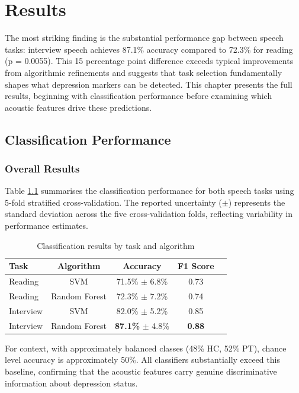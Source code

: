 \chapter{Results}

The most striking finding is the substantial performance gap between speech tasks: interview speech achieves 87.1\% accuracy compared to 72.3\% for reading (p = 0.0055). This 15 percentage point difference exceeds typical improvements from algorithmic refinements and suggests that task selection fundamentally shapes what depression markers can be detected. This chapter presents the full results, beginning with classification performance before examining which acoustic features drive these predictions.

\section{Classification Performance}

\subsection{Overall Results}

Table \ref{tab:classification-results} summarises the classification performance for both speech tasks using 5-fold stratified cross-validation. The reported uncertainty ($\pm$) represents the standard deviation across the five cross-validation folds, reflecting variability in performance estimates.

\begin{table}[h]
\centering
\caption{Classification results by task and algorithm}
\label{tab:classification-results}
\begin{tabular}{lcccc}
\hline
\textbf{Task} & \textbf{Algorithm} & \textbf{Accuracy} & \textbf{F1 Score} \\
\hline
Reading & SVM & 71.5\% $\pm$ 6.8\% & 0.73 \\
Reading & Random Forest & 72.3\% $\pm$ 7.2\% & 0.74 \\
\hline
Interview & SVM & 82.0\% $\pm$ 5.2\% & 0.85 \\
Interview & Random Forest & \textbf{87.1\%} $\pm$ 4.8\% & \textbf{0.88} \\
\hline
\end{tabular}
\end{table}

For context, with approximately balanced classes (48\% HC, 52\% PT), chance level accuracy is approximately 50\%. All classifiers substantially exceed this baseline, confirming that the acoustic features carry genuine discriminative information about depression status.

